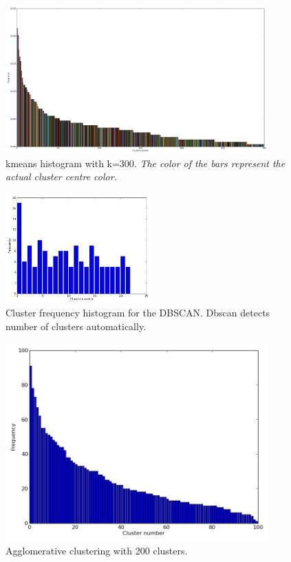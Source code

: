 \documentclass[10pt,twocolumn,letterpaper]{article}
\begin{document}
\begin{figure}[p]
  \centering
  \includegraphics[width=0.90\textwidth]{../300_histogram.png}
  \caption{kmeans histogram with k=300. \emph{The color of the bars
represent the actual cluster centre color.}}
  \label{k-300}
\end{figure}

\begin{figure}[p]
  \centering
  \includegraphics[width=0.50\textwidth]{../dbscan_hist.png}
  \caption{Cluster frequency histogram for the DBSCAN. Dbscan detects
    number of clusters automatically.}
  \label{dbscan}
\end{figure}

\begin{figure}[p] 
  \centering
  \includegraphics[width=0.90\textwidth]{../agglo_hist.png}
  \caption{Agglomerative clustering with 200 clusters. }
  \label{agglo}
\end{figure}
\end{document}
